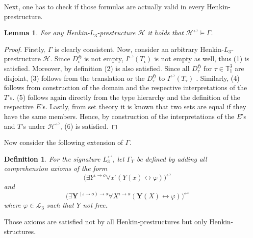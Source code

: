 \documentclass[11pt,a4paper]{article}
\newtheorem{lemma}[theorem]{Lemma}
\newtheorem{mydef}{Definition}
\newcommand{\tofo}{\hookleftarrow}
\newcommand{\of}{\iota }
\newcommand{\os}{\iota \to o}
\newcommand{\ot}{(\iota \to o)\to o}
\begin{document}
Next, one has to check if those formulas are actually valid in every Henkin-prestructure.

\begin{lemma}
\label{lemma:gamma-sat}
For any Henkin-$L_3$-prestructure $\mathcal{H}$  it holds that $\mathcal{H}^{\tofo} \models \Gamma$.
\end{lemma}
\begin{proof}
Firstly, $\Gamma$ is clearly consistent. Now, consider an arbitrary Henkin-$L_3$-prestructure $\mathcal{H}$. Since $D_{\of}^{\mathfrak{H}}$ is not empty, $I^{\tofo}(T_{\of})$ is not empty as well, thus (1) is satisfied. Moreover, by definition (2) is also satisfied. Since all $D_{\tau}^{\mathfrak{H}}$ for $\tau \in \mathbb{T}_1^3$ are disjoint, (3) follows from the translation or the $D_{\tau}^{\mathfrak{H}}$ to $I^{\tofo}(T_{\tau})$ . Similarly, (4) follows from construction of the domain and the respective interpretations of the $T$'s. (5) follows again directly from the type hierarchy and the definition of the respective $E$'s. Lastly, from set theory it is known that two sets are equal if they have the same members. Hence, by construction of the interpretations of the $E$'s and $T$'s under $\mathcal{H}^{\tofo}$, (6) is satisfied.
\end{proof}


Now consider the following extension of $\Gamma$.


\begin{mydef}
For the signature $L_3^{\tofo}$, let $\Gamma_T$ be defined by adding all comprehension axioms of the form
\begin{equation*}
\big(\exists Y^{\os} \forall x^{\of} (Y(x) \leftrightarrow \varphi)\big)^{\tofo}
\end{equation*}
and
\begin{equation*}
\big(\exists \mathbf{Y}^{\ot} \forall X^{\os} (\mathbf{Y}(X) \leftrightarrow \varphi))^{\tofo}
\end{equation*}
where $\varphi \in \mathcal{L}_3$ such that $Y$ not free.

\end{mydef}

Those axioms are satisfied not by all Henkin-prestructures but only Henkin-structures.
\end{document}
